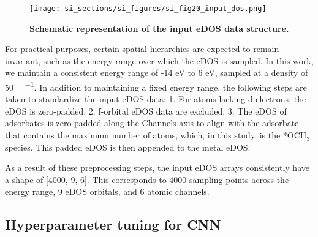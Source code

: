 \begin{figure}
  \centering
  \texttt{[image: si\_sections/si\_figures/si\_fig20\_input\_dos.png]}
  \caption{\textbf{Schematic representation of the input eDOS data structure.}}
  \label{si_fig20:input_dos}
\end{figure}


For practical purposes, certain spatial hierarchies are expected to remain invariant,
such as the energy range over which the eDOS is sampled.
In this work, we maintain a consistent energy range of -14 eV to 6 eV,
sampled at a density of 50 \si{ \cdot {}^{-1}}.
In addition to maintaining a fixed energy range,
the following steps are taken to standardize the input eDOS data:
  1.	For atoms lacking d-electrons, the eDOS is zero-padded.
  2.	f-orbital eDOS data are excluded.
  3.	The eDOS of adsorbates is zero-padded along the Channels axis to align with the adsorbate that contains the maximum number of atoms, which, in this study, is the *OCH$_3$ species. This padded eDOS is then appended to the metal eDOS.

As a result of these preprocessing steps, the input eDOS arrays consistently have a shape of [4000, 9, 6].
This corresponds to 4000 sampling points across the energy range, 9 eDOS orbitals, and 6 atomic channels.


\subsection{Hyperparameter tuning for CNN}


